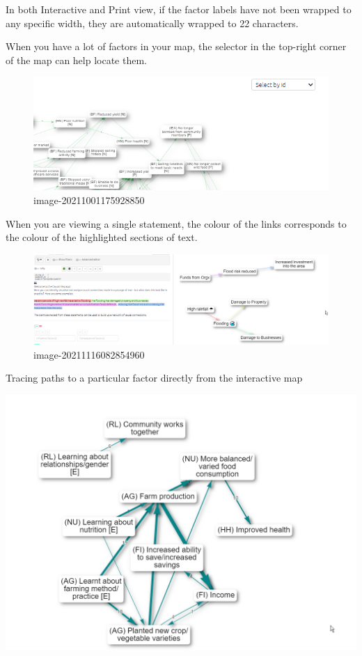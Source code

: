 \documentclass[
]{book}
\begin{document}
In both Interactive and Print view, if the factor labels have not been wrapped to any specific width, they are automatically wrapped to 22 characters.

When you have a lot of factors in your map, the selector in the top-right corner of the map can help locate them.

\begin{figure}
\centering
\includegraphics[width=6.77083in,height=\textheight]{_assets/nodeselect.gif}
\caption{image-20211001175928850}
\end{figure}

When you are viewing a single statement, the colour of the links corresponds to the colour of the highlighted sections of text.

\begin{figure}
\centering
\includegraphics{_assets/image-20211116082854960.png}
\caption{image-20211116082854960}
\end{figure}

Tracing paths to a particular factor directly from the interactive map

\includegraphics{_assets/BhOlErDmwB.gif}
\end{document}
